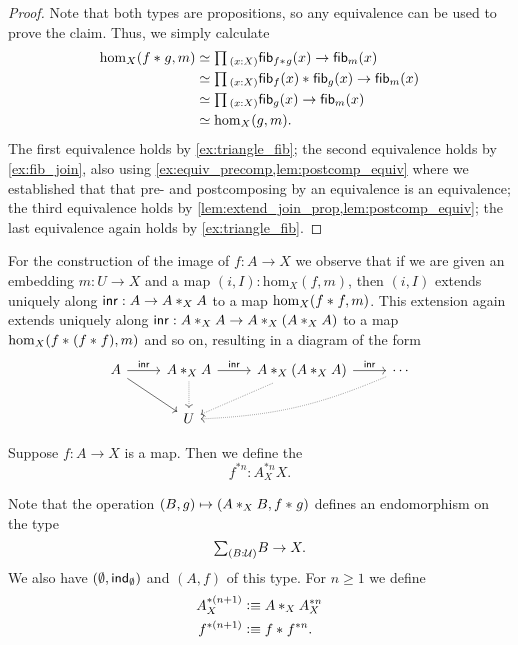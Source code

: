 \begin{proof}
Note that both types are propositions, so any equivalence can be used to prove the claim. Thus, we simply calculate
\begin{align*}
\mathrm{hom}_X(\join{f}{g},m) & \eqvsym \prd{x:X}\fib{\join{f}{g}}{x}\to \fib{m}{x} \\
& \eqvsym \prd{x:X}\join{\fib{f}{x}}{\fib{g}{x}}\to\fib{m}{x} \\
& \eqvsym \prd{x:X}\fib{g}{x}\to\fib{m}{x} \\
& \eqvsym \mathrm{hom}_X(g,m).
\end{align*}
The first equivalence holds by \cref{ex:triangle_fib}; the second equivalence holds by \cref{ex:fib_join}, also using \cref{ex:equiv_precomp,lem:postcomp_equiv} where we established that that pre- and postcomposing by an equivalence is an equivalence; the third equivalence holds by \cref{lem:extend_join_prop,lem:postcomp_equiv}; the last equivalence again holds by \cref{ex:triangle_fib}.
\end{proof}

For the construction of the image of $f:A\to X$ we observe that if we are given an embedding $m:U\to X$ and a map $(i,I):\mathrm{hom}_X(f,m)$, then $(i,I)$ extends uniquely along $\inr:A\to \join[X]{A}{A}$ to a map $\mathrm{hom}_X(\join{f}{f},m)$. This extension again extends uniquely along $\inr:\join[X]{A}{A}\to \join[X]{A}{(\join[X]{A}{A})}$ to a map $\mathrm{hom}_X(\join{f}{(\join{f}{f})},m)$ and so on, resulting in a diagram of the form
\begin{equation*}
\begin{tikzcd}
A \arrow[dr] \arrow[r,"\inr"] & \join[X]{A}{A} \arrow[d,densely dotted] \arrow[r,"\inr"] & \join[X]{A}{(\join[X]{A}{A})} \arrow[dl,densely dotted] \arrow[r,"\inr"] & \cdots \arrow[dll,densely dotted,bend left=10] \\
& U
\end{tikzcd}
\end{equation*}

\begin{defn}
Suppose $f:A\to X$ is a map. Then we define the  
\begin{equation*}
f^{\ast n}:A_X^{\ast n} X.
\end{equation*}
\end{defn}

\begin{constr}
Note that the operation $(B,g)\mapsto (\join[X]{A}{B},\join{f}{g})$ defines an endomorphism on the type
\begin{equation*}
\sm{B:\UU}B\to X.
\end{equation*}
We also have $(\emptyt,\ind{\emptyt})$ and $(A,f)$ of this type. For $n\geq 1$ we define
\begin{align*}
A_X^{\ast (n+1)} & \defeq \join[X]{A}{A_X^{\ast n}} \\
f^{\ast (n+1)} & \defeq \join{f}{f^{\ast n}}.\qedhere
\end{align*}
\end{constr}

